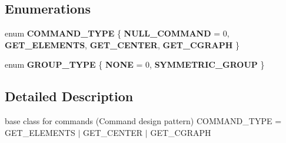 \subsection*{\-Enumerations}
\begin{DoxyCompactItemize}
\item 
enum {\bfseries \-C\-O\-M\-M\-A\-N\-D\-\_\-\-T\-Y\-P\-E} \{ {\bfseries \-N\-U\-L\-L\-\_\-\-C\-O\-M\-M\-A\-N\-D} =  0, 
{\bfseries \-G\-E\-T\-\_\-\-E\-L\-E\-M\-E\-N\-T\-S}, 
{\bfseries \-G\-E\-T\-\_\-\-C\-E\-N\-T\-E\-R}, 
{\bfseries \-G\-E\-T\-\_\-\-C\-G\-R\-A\-P\-H}
 \}
\item 
enum {\bfseries \-G\-R\-O\-U\-P\-\_\-\-T\-Y\-P\-E} \{ {\bfseries \-N\-O\-N\-E} =  0, 
{\bfseries \-S\-Y\-M\-M\-E\-T\-R\-I\-C\-\_\-\-G\-R\-O\-U\-P}
 \}
\end{DoxyCompactItemize}


\subsection{\-Detailed \-Description}
base class for commands (\-Command design pattern) \-C\-O\-M\-M\-A\-N\-D\-\_\-\-T\-Y\-P\-E = \-G\-E\-T\-\_\-\-E\-L\-E\-M\-E\-N\-T\-S $|$ \-G\-E\-T\-\_\-\-C\-E\-N\-T\-E\-R $|$ \-G\-E\-T\-\_\-\-C\-G\-R\-A\-P\-H 